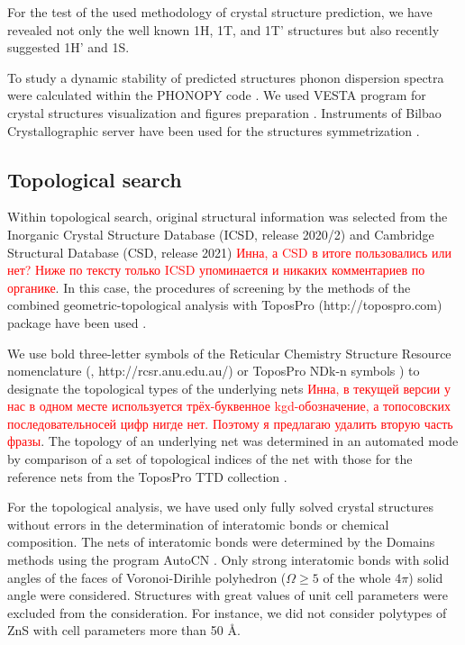 \documentclass[a4paperm]{article}
\begin{document}
For the test of the used methodology of crystal structure prediction, we have revealed not only the well known 1H, 1T, and 1T' structures but also recently suggested 1H' and 1S.

To study a dynamic stability of predicted structures phonon dispersion spectra were calculated within the PHONOPY code \cite{phonopy}. 
We used VESTA program for crystal structures visualization and figures preparation \cite{momma2011vesta}.
Instruments of Bilbao Crystallographic server have been used for the structures symmetrization \cite{bilbao}.



\subsection*{Topological search}

Within topological search, original structural information was selected from the Inorganic Crystal Structure Database (ICSD, release 2020/2) \cite{icsd_1} and Cambridge Structural Database (CSD, release 2021) \cite{icsd_2} 
\textcolor{red}{Инна, а CSD в итоге пользовались или нет? Ниже по тексту только ICSD упоминается и никаких комментариев по органике}.
In this case, the procedures of screening  by the methods of the combined geometric-topological analysis with ToposPro (http://topospro.com) package have been used \cite{topos_1}. 

We use bold three-letter symbols of the Reticular Chemistry Structure Resource nomenclature (\cite{rcsr}, http://rcsr.anu.edu.au/) or ToposPro NDk-n symbols \cite{rcsr_2}) to designate the topological types of the underlying nets
\textcolor{red}{Инна, в текущей версии у нас в одном месте используется трёх-буквенное kgd-обозначение, а топосовских последовательносей цифр нигде нет. Поэтому я предлагаю удалить вторую часть фразы}.
The topology of an underlying net was determined in an automated mode by comparison of a set of topological indices of the net with those for the reference nets from the ToposPro TTD collection \cite{TTD}.

For the topological analysis, we have used only fully solved crystal structures without errors in the determination of interatomic bonds or chemical composition.
The nets of interatomic bonds were determined by the Domains methods using the program AutoCN \cite{blatov2016_rods}. 
Only strong interatomic bonds with solid angles of the faces of Voronoi-Dirihle polyhedron ($\Omega \geq 5 $ of the whole 4$\pi$) solid angle were considered.
Structures with great values of unit cell parameters were excluded from the consideration.
For instance, we did not consider polytypes of ZnS with cell parameters more than 50 \AA.
\end{document}

